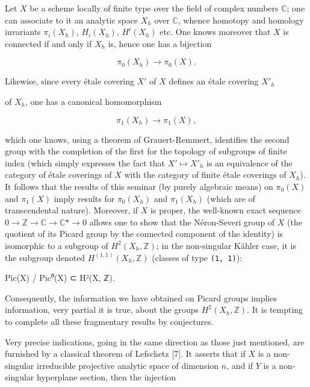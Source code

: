 \documentclass[
]{article}
\newenvironment{Shaded}{}{}
\newcommand{\NormalTok}[1]{#1}
\begin{document}
Let \(X\) be a scheme locally of finite type over the field of complex
numbers \(\mathbb{C}\); one can associate to it an analytic space
\(X_{h}\) over \(\mathbb{C}\), whence homotopy and homology invariants
\(\pi_{i}(X_{h})\), \(H_{i}(X_{h})\), \(H^{i}(X_{h})\) etc. One knows
moreover that \(X\) is connected if and only if \(X_{h}\) is, hence one
has a bijection

\[
\pi_{0}(X_{h}) \to \pi_{0}(X).
\]

Likewise, since every étale covering \(X'\) of \(X\) defines an étale
covering \(X'_{h}\)

of \(X_{h}\), one has a canonical homomorphism

\[
\pi_{1}(X_{h}) \to \pi_{1}(X),
\]

which one knows, using a theorem of Grauert-Remmert, identifies the
second group with the completion of the first for the topology of
subgroups of finite index (which simply expresses the fact that
\(X' \mapsto X'_{h}\) is an equivalence of the category of étale
coverings of \(X\) with the category of finite étale coverings of
\(X_{h}\)). It follows that the results of this seminar (by purely
algebraic means) on \(\pi_{0}(X)\) and \(\pi_{1}(X)\) imply results for
\(\pi_{0}(X_{h})\) and \(\pi_{1}(X_{h})\) (which are of transcendental
nature). Moreover, if \(X\) is proper, the well-known exact sequence
\(0 \to \mathbb{Z} \to \mathbb{C} \to \mathbb{C}* \to 0\) allows one to
show that the Néron-Severi group of \(X\) (the quotient of its Picard
group by the connected component of the identity) is isomorphic to a
subgroup of \(H^{2}(X_{h}, \mathbb{Z})\); in the non-singular Kähler
case, it is the subgroup denoted \(H^{(1,1)}(X_{h}, \mathbb{Z})\)
(classes of type \texttt{(1,\ 1)}):

\begin{Shaded}
\begin{Highlighting}[]
\NormalTok{Pic(X) / Pic⁰(X) ⊂ H²(X, ℤ).}
\end{Highlighting}
\end{Shaded}

Consequently, the information we have obtained on Picard groups implies
information, very partial it is true, about the groups
\(H^{2}(X_{h}, \mathbb{Z})\). It is tempting to complete all these
fragmentary results by conjectures.

Very precise indications, going in the same direction as those just
mentioned, are furnished by a classical theorem of Lefschetz {[}7{]}. It
asserts that if \(X\) is a non-singular irreducible projective analytic
space of dimension \(n\), and if \(Y\) is a non-singular hyperplane
section, then the injection
\end{document}
